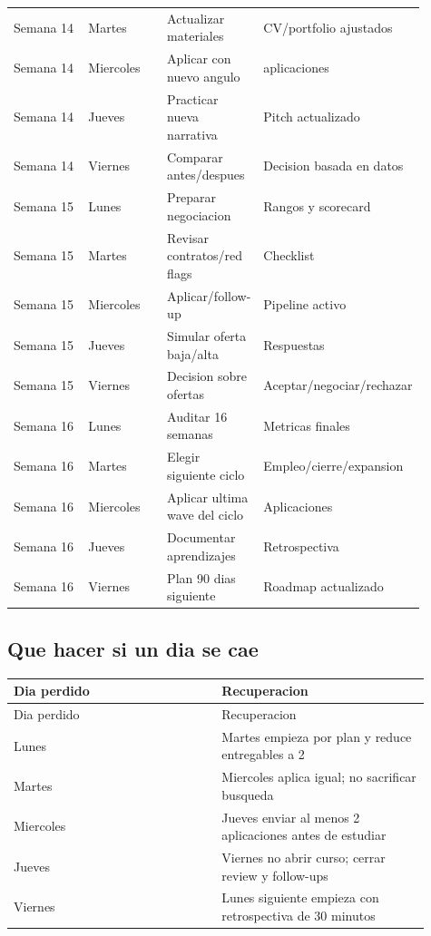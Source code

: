 \begin{center}
\begin{longtable}{>{\raggedright\arraybackslash}p{0.225\linewidth} >{\raggedright\arraybackslash}p{0.225\linewidth} >{\raggedright\arraybackslash}p{0.225\linewidth} >{\raggedright\arraybackslash}p{0.225\linewidth}}
Semana 14 & Martes & Actualizar materiales & CV/portfolio ajustados \\
Semana 14 & Miercoles & Aplicar con nuevo angulo & 5 aplicaciones \\
Semana 14 & Jueves & Practicar nueva narrativa & Pitch actualizado \\
Semana 14 & Viernes & Comparar antes/despues & Decision basada en datos \\
Semana 15 & Lunes & Preparar negociacion & Rangos y scorecard \\
Semana 15 & Martes & Revisar contratos/red flags & Checklist \\
Semana 15 & Miercoles & Aplicar/follow-up & Pipeline activo \\
Semana 15 & Jueves & Simular oferta baja/alta & Respuestas \\
Semana 15 & Viernes & Decision sobre ofertas & Aceptar/negociar/rechazar \\
Semana 16 & Lunes & Auditar 16 semanas & Metricas finales \\
Semana 16 & Martes & Elegir siguiente ciclo & Empleo/cierre/expansion \\
Semana 16 & Miercoles & Aplicar ultima wave del ciclo & Aplicaciones \\
Semana 16 & Jueves & Documentar aprendizajes & Retrospectiva \\
Semana 16 & Viernes & Plan 90 dias siguiente & Roadmap actualizado \\
\bottomrule
\end{longtable}
\end{center}



\subsection{Que hacer si un dia se cae}


\begin{center}
\scriptsize
\begin{longtable}{>{\raggedright\arraybackslash}p{0.455\linewidth} >{\raggedright\arraybackslash}p{0.455\linewidth}}
\toprule
Dia perdido & Recuperacion \\
\midrule
\endfirsthead
\toprule
Dia perdido & Recuperacion \\
\midrule
\endhead
Lunes & Martes empieza por plan y reduce entregables a 2 \\
Martes & Miercoles aplica igual; no sacrificar busqueda \\
Miercoles & Jueves enviar al menos 2 aplicaciones antes de estudiar \\
Jueves & Viernes no abrir curso; cerrar review y follow-ups \\
Viernes & Lunes siguiente empieza con retrospectiva de 30 minutos \\
\bottomrule
\end{longtable}
\end{center}



